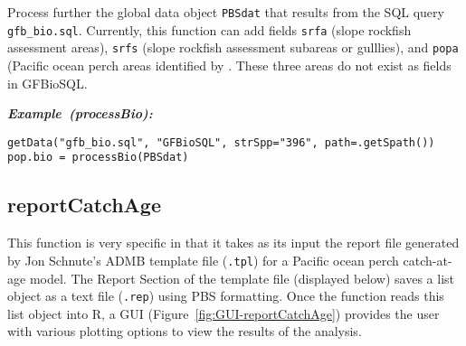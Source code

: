 \documentclass[letterpaper,12pt,fleqn]{article}
\def\tab{\hspace{0.5 in}}
\newcommand{\code}[1]{\small\texttt{#1}\normalsize}
\newcommand{\db}[1]{\small\textmd{\textsf{#1}}\normalsize}
\newcommand\example[1]{    %
	\textbf{\emph{Example~(#1):}}\\ \vspace{3 pt}
}
\begin{document}
\tab Process further the global data object \code{PBSdat} that results from the SQL query \code{gfb\_bio.sql}.  Currently, this function can add fields \code{srfa} (slope rockfish assessment areas), \code{srfs} (slope rockfish assessment subareas or gulllies), and \code{popa} (Pacific ocean perch areas identified by \citet{Schnute-etal:2001}. These three areas do not exist as fields in \db{GFBioSQL}.

\begin{examplebox}
\example{processBio}
\begin{Verbatim}[fontsize=\footnotesize]
getData("gfb_bio.sql", "GFBioSQL", strSpp="396", path=.getSpath())
pop.bio = processBio(PBSdat)
\end{Verbatim}
\end{examplebox}

\subsection {reportCatchAge}

\tab This function is very specific in that it takes as its input the report file generated by Jon Schnute's ADMB template file (\code{.tpl}) for a Pacific ocean perch catch-at-age model. The Report Section of the template file (displayed below) saves a list object as a text file (\code{.rep}) using PBS formatting. Once the function reads this list object into R, a GUI (Figure~\ref{fig:GUI-reportCatchAge}) provides the user with various plotting options to view the results of the analysis. 
\end{document}
